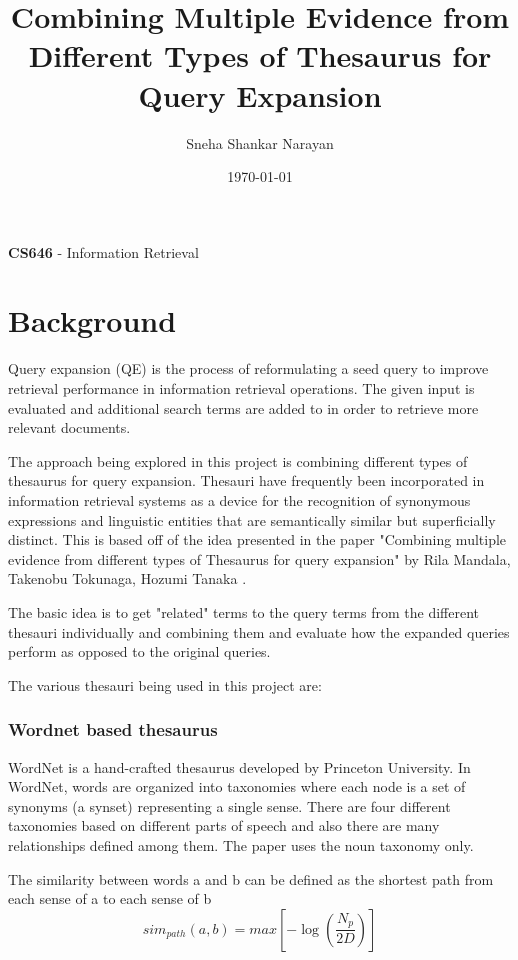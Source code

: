 \documentclass[a4paper, 12pt, notitlepage]{report}
\title{Combining Multiple Evidence from Different Types of Thesaurus for Query Expansion}
\author{Sneha Shankar Narayan}
\date{\today}
\begin{document}
\maketitle
\begin{center}
\Large{
\textbf{CS646} - Information Retrieval}
\end{center}
\newpage

\tableofcontents

\chapter{Background}
Query expansion (QE) is the process of reformulating a seed query to improve retrieval performance in information retrieval operations. \cite{wiki} The given input is evaluated and additional search terms are added to in order to retrieve more relevant documents.

The approach being explored in this project is combining different types of thesaurus for query expansion. Thesauri
have frequently been incorporated in information retrieval systems as a device for the recognition of synonymous expressions and linguistic entities that are semantically similar but superficially distinct. \cite{paper}
This is based off of the idea presented in the paper "Combining multiple evidence from different types of Thesaurus for query expansion" by Rila Mandala, Takenobu Tokunaga, Hozumi Tanaka \cite{paper}. 

The basic idea is to get "related" terms to the query terms from the different thesauri individually and combining them and evaluate how the expanded queries perform as opposed to the original queries.

The various thesauri being used in this project are:
\subsection*{Wordnet based thesaurus}
WordNet is a hand-crafted thesaurus developed by Princeton University. In WordNet, words are organized into taxonomies where each node is a set of synonyms (a synset) representing a single sense. There are four different taxonomies based on different parts of speech and also there are many relationships defined among
them. \cite{paper} The paper uses the noun taxonomy only.

The similarity between words a and b can be defined as the shortest path from each sense of a to each sense of b
\begin{equation*}
sim_{path}(a, b) = max[-\log(\frac{N_p}{2D})]
\end{equation*}
\end{document}
